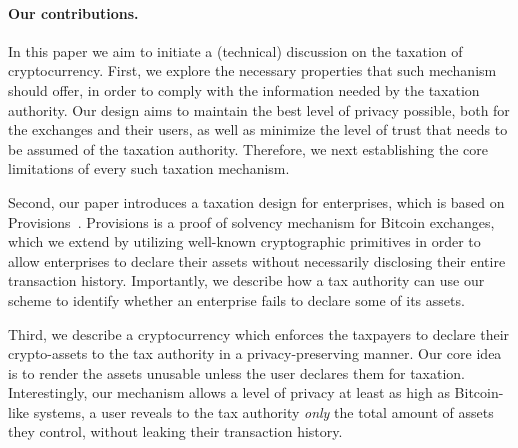 \paragraph{Our contributions.}

In this paper we aim to initiate a (technical) discussion on the taxation of
cryptocurrency. First, we explore the necessary properties that such mechanism
should offer, in order to comply with the information needed by the taxation
authority. Our design aims to maintain the best level of privacy possible, both
for the exchanges and their users, as well as minimize the level of trust that
needs to be assumed of the taxation authority. Therefore, we next establishing
the core limitations of every such taxation mechanism.

Second, our paper introduces a taxation design for enterprises, which is based
on Provisions~\cite{CCS:DBBCB15}. Provisions is a proof of solvency mechanism
for Bitcoin exchanges, which we extend by utilizing well-known cryptographic
primitives in order to allow enterprises to declare their assets without
necessarily disclosing their entire transaction history. Importantly, we
describe how a tax authority can use our scheme to identify whether an
enterprise fails to declare some of its assets.

Third, we describe a cryptocurrency which enforces the taxpayers to declare
their crypto-assets to the tax authority in a privacy-preserving manner. Our
core idea is to render the assets unusable unless the user declares them for
taxation. Interestingly, our mechanism allows a level of privacy at least as
high as Bitcoin-like systems, \ie a user reveals to the tax authority
\emph{only} the total amount of assets they control, without leaking their
transaction history.
